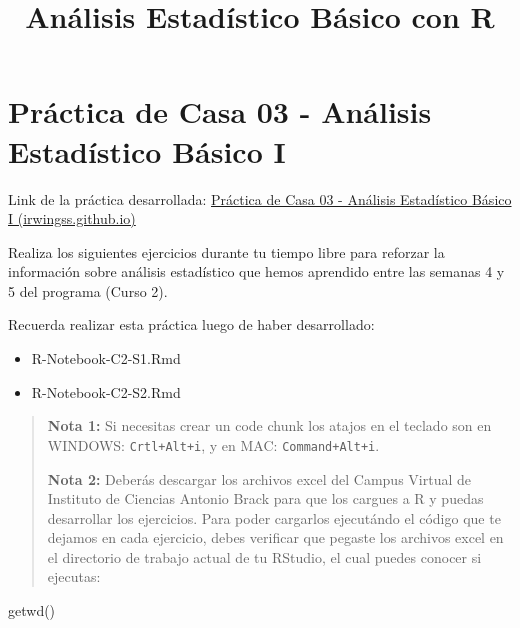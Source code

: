 \documentclass[
]{article}
\title{Análisis Estadístico Básico con R}
\author{}
\date{\vspace{-2.5em}}
\newenvironment{Shaded}{}{}
\newcommand{\FunctionTok}[1]{\textcolor[rgb]{0.02,0.16,0.49}{#1}}
\newcommand{\NormalTok}[1]{#1}
\begin{document}
\maketitle

{
\setcounter{tocdepth}{2}
\tableofcontents
}
\hypertarget{pruxe1ctica-de-casa-03---anuxe1lisis-estaduxedstico-buxe1sico-i}{%
\section{\texorpdfstring{\textbf{Práctica de Casa 03 - Análisis
Estadístico Básico
I}}{Práctica de Casa 03 - Análisis Estadístico Básico I}}\label{pruxe1ctica-de-casa-03---anuxe1lisis-estaduxedstico-buxe1sico-i}}

Link de la práctica desarrollada:
\href{https://irwingss.github.io/IrwingRLab/PractCasa03-full.html}{Práctica
de Casa 03 - Análisis Estadístico Básico I (irwingss.github.io)}

Realiza los siguientes ejercicios durante tu tiempo libre para reforzar
la información sobre análisis estadístico que hemos aprendido entre las
semanas 4 y 5 del programa (Curso 2).

Recuerda realizar esta práctica luego de haber desarrollado:

\begin{itemize}
\item
  R-Notebook-C2-S1.Rmd
\item
  R-Notebook-C2-S2.Rmd
\end{itemize}

\begin{quote}
\textbf{Nota 1:} Si necesitas crear un code chunk los atajos en el
teclado son en WINDOWS: \texttt{Crtl+Alt+i}, y en MAC:
\texttt{Command+Alt+i}.

\textbf{Nota 2:} Deberás descargar los archivos excel del Campus Virtual
de Instituto de Ciencias Antonio Brack para que los cargues a R y puedas
desarrollar los ejercicios. Para poder cargarlos ejecutándo el código
que te dejamos en cada ejercicio, debes verificar que pegaste los
archivos excel en el directorio de trabajo actual de tu RStudio, el cual
puedes conocer si ejecutas:
\end{quote}

\begin{Shaded}
\begin{Highlighting}[]
\FunctionTok{getwd}\NormalTok{()}
\end{Highlighting}
\end{Shaded}
\end{document}
